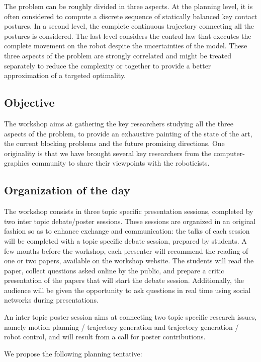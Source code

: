 \documentclass[12pt]{article}
\begin{document}
The problem can be roughly divided in three aspects. At the planning level, it is often considered to compute a discrete sequence of statically balanced key contact postures. In a second level, the complete continuous trajectory connecting all the postures is considered. The last level considers the control law that executes the complete movement on the robot despite the uncertainties of the model. These three aspects of the problem are strongly correlated and might be treated separately to reduce the complexity or together to provide a better approximation of a targeted optimality.

\subsection{Objective}
The workshop aims at gathering the key researchers studying all the three aspects of the problem, to provide an exhaustive painting of the state of the art, the current blocking problems and the future promising directions. One originality is that we have brought several key researchers from the computer-graphics community to share their viewpoints with the roboticists.

\subsection{Organization of the day}
The workshop consists in three topic specific presentation sessions, completed by two inter topic debate/poster sessions. These sessions are organized in an original fashion so as to enhance exchange and communication: the talks of each session will be completed with a topic specific
debate session, prepared by students.
A few months before the workshop, each presenter will recommend the reading of one or two papers, available on the workshop website. 
The students will read the paper, collect questions asked online by the public, and prepare a critic presentation of the papers that will start the debate session. Additionally, the audience will be given the opportunity to ask questions in real time using social networks during presentations.

An inter topic poster session aims at connecting two topic specific research issues, namely motion planning / trajectory generation and trajectory generation / robot control, and will result from a call for poster contributions.

We propose the following planning tentative: \\
\end{document}
